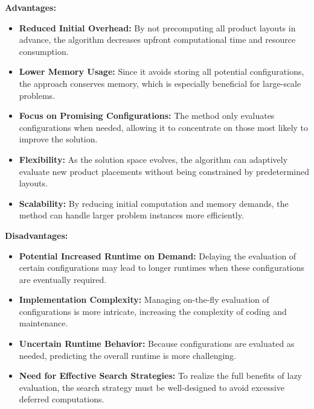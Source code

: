 \documentclass[a4paper]{article}
\begin{document}
\noindent\textbf{Advantages:} 
\begin{itemize}
        \item \textbf{Reduced Initial Overhead:} By not precomputing all product layouts in advance, the algorithm decreases upfront computational time and resource consumption.
        \item \textbf{Lower Memory Usage:} Since it avoids storing all potential configurations, the approach conserves memory, which is especially beneficial for large-scale problems.
        \item \textbf{Focus on Promising Configurations:} The method only evaluates configurations when needed, allowing it to concentrate on those most likely to improve the solution.
        \item \textbf{Flexibility:} As the solution space evolves, the algorithm can adaptively evaluate new product placements without being constrained by predetermined layouts.
        \item \textbf{Scalability:} By reducing initial computation and memory demands, the method can handle larger problem instances more efficiently.
    \end{itemize}

\vspace{0.35cm}

\noindent\textbf{Disadvantages:}
\begin{itemize}
        \item \textbf{Potential Increased Runtime on Demand:} Delaying the evaluation of certain configurations may lead to longer runtimes when these configurations are eventually required.
        \item \textbf{Implementation Complexity:} Managing on-the-fly evaluation of configurations is more intricate, increasing the complexity of coding and maintenance.
        \item \textbf{Uncertain Runtime Behavior:} Because configurations are evaluated as needed, predicting the overall runtime is more challenging.
        \item \textbf{Need for Effective Search Strategies:} To realize the full benefits of lazy evaluation, the search strategy must be well-designed to avoid excessive deferred computations.
    \end{itemize}
\end{document}

